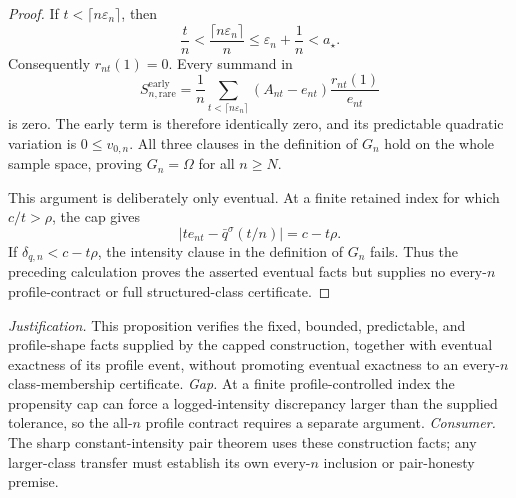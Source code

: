 \documentclass{article}
\begin{document}
\begin{proof}
If \(t<\lceil n\varepsilon_n\rceil\), then
\[
 \frac tn<\frac{\lceil n\varepsilon_n\rceil}{n}
 \le \varepsilon_n+\frac1n<a_\star.
\]
Consequently \(r_{nt}(1)=0\).  Every summand in
\[
 S_{n,\mathrm{rare}}^{\mathrm{early}}
 =\frac1n\sum_{t<\lceil n\varepsilon_n\rceil}
 (A_{nt}-e_{nt})\frac{r_{nt}(1)}{e_{nt}}
\]
is zero.  The early term is therefore identically zero, and its predictable quadratic variation is \(0\le v_{0,n}\).  All three clauses in the definition of \(G_n\) hold on the whole sample space, proving \(G_n=\Omega\) for all \(n\ge N\).

This argument is deliberately only eventual.  At a finite retained index for which \(c/t>\rho\), the cap gives
\[
 |t e_{nt}-\bar q^\sigma(t/n)|=c-t\rho.
\]
If \(\delta_{q,n}<c-t\rho\), the intensity clause in the definition of \(G_n\) fails.  Thus the preceding calculation proves the asserted eventual facts but supplies no every-\(n\) profile-contract or full structured-class certificate.
\end{proof}
\par\smallskip\noindent \textit{Justification.} This proposition verifies the fixed, bounded, predictable, and profile-shape facts supplied by the capped construction, together with eventual exactness of its profile event, without promoting eventual exactness to an every-\(n\) class-membership certificate. \textit{Gap.} At a finite profile-controlled index the propensity cap can force a logged-intensity discrepancy larger than the supplied tolerance, so the all-\(n\) profile contract requires a separate argument. \textit{Consumer.} The sharp constant-intensity pair theorem uses these construction facts; any larger-class transfer must establish its own every-\(n\) inclusion or pair-honesty premise.
\end{document}
